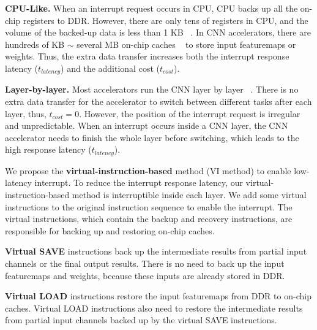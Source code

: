 \textbf{CPU-Like.}
When an interrupt request occurs in CPU, CPU backs up all the on-chip registers to DDR. However, there are only tens of registers in CPU, and the volume of the backed-up data is less than 1 KB  ~\cite{furber2000arm}. In CNN accelerators, there are hundreds of KB $\sim$ several MB on-chip caches  ~\cite{qiu2016going, guo2017angel} to store input featuremaps or weights. 
Thus, the extra data transfer increases both the interrupt response latency ($t_{latency}$) and the additional cost ($t_{cost}$).

\textbf{Layer-by-layer.}
Most accelerators run the CNN layer by layer  ~\cite{qiu2016going,guo2017angel}. 
There is no extra data transfer for the accelerator to switch between different tasks after each layer, thus, $t_{cost}=0$. 
However, the position of the interrupt request is irregular and unpredictable. When an interrupt occurs inside a CNN layer, the CNN accelerator needs to finish the whole layer before switching, which leads to the high response latency ($t_{latency}$).




We propose the \textbf{virtual-instruction-based} method (VI method) to enable low-latency interrupt. 
To reduce the interrupt response latency, our virtual-instruction-based method is interruptible inside each layer. We add some virtual instructions to the original instruction sequence to enable the interrupt.
The virtual instructions, which contain the backup and recovery instructions, are responsible for backing up and restoring on-chip caches. 

\textbf{Virtual SAVE} instructions back up the intermediate results from partial input channels or the final output results. There is no need to back up the input featuremaps and weights, because these inputs are already stored in DDR. 

\textbf{Virtual LOAD} instructions restore the input featuremaps from DDR to on-chip caches.
Virtual LOAD instructions also need to restore the intermediate results from partial input channels backed up by the virtual SAVE instructions.

